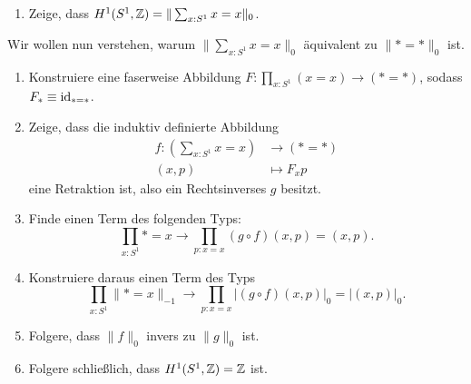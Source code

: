 \documentclass{uebung}
\begin{document}

\begin{exercise}
\end{exercise}

\begin{exercise}
  \begin{enumerate}
    \item Zeige, dass $H^1(S^1,\mathbb{Z}) = \|\sum_{x:S^1} x=x\|_0$.
  \end{enumerate}
  Wir wollen nun verstehen, warum $\|\sum_{x:S^1} x=x\|_0$ äquivalent zu $\|\ast = \ast\|_0$ ist.
  \begin{enumerate}[start=2]
    \item Konstruiere eine faserweise Abbildung $F:\prod_{x:S^1} (x = x) \to (\ast = \ast)$, sodass $F_\ast\equiv\mathrm{id}_{\ast = \ast}$.
    \item Zeige, dass die induktiv definierte Abbildung
      \begin{align*}
        f:\left(\sum_{x:S^1} x=x\right) &\to (\ast=\ast)\\
        (x,p)&\mapsto F_xp
      \end{align*}
      eine Retraktion ist, also ein Rechtsinverses $g$ besitzt.
    \item Finde einen Term des folgenden Typs:
      $$
      \prod_{x:S^1} \ast=x \to \prod_{p:x=x} (g\circ f)(x,p) = (x,p).
      $$
    \item Konstruiere daraus einen Term des Typs
      $$
      \prod_{x:S^1} \|\ast=x\|_{-1} \to \prod_{p:x=x} |(g\circ f)(x,p)|_0 = |(x,p)|_0.
      $$
    \item Folgere, dass $\|f\|_0$ invers zu $\|g\|_0$ ist.
    \item Folgere schließlich, dass $H^1(S^1,\mathbb{Z}) = \mathbb{Z}$ ist.
  \end{enumerate}
\end{exercise}

\begin{exercise}
\end{exercise}
\end{document}
